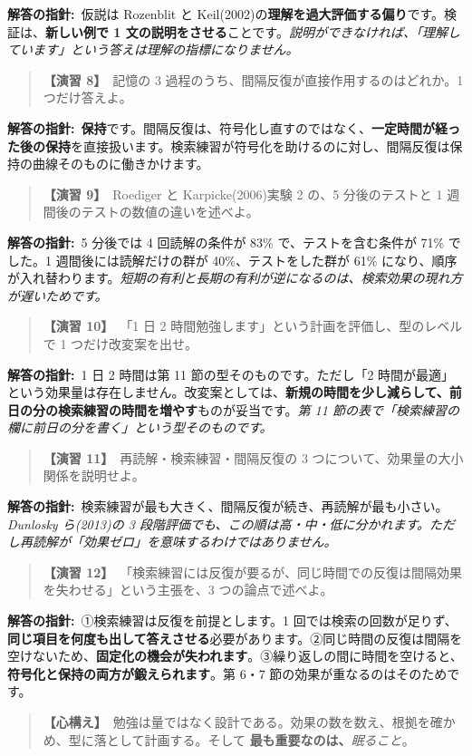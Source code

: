 \documentclass{article}
\begin{document}
\textbf{解答の指針:}\ 仮説は Rozenblit と Keil(2002)の\textbf{理解を過大評価する偏り}です。検証は、\textbf{新しい例で 1 文の説明をさせる}ことです。\emph{説明ができなければ、「理解しています」という答えは理解の指標になりません。}

\begin{quote}
\textbf{【演習 8】}\ 記憶の 3 過程のうち、間隔反復が直接作用するのはどれか。1 つだけ答えよ。
\end{quote}

\textbf{解答の指針:}\ \textbf{保持}です。間隔反復は、符号化し直すのではなく、\textbf{一定時間が経った後の保持}を直接扱います。検索練習が符号化を助けるのに対し、間隔反復は保持の曲線そのものに働きかけます。

\begin{quote}
\textbf{【演習 9】}\ Roediger と Karpicke(2006)実験 2 の、5 分後のテストと 1 週間後のテストの数値の違いを述べよ。
\end{quote}

\textbf{解答の指針:}\ 5 分後では 4 回読解の条件が 83\% で、テストを含む条件が 71\% でした。1 週間後には読解だけの群が 40\%、テストをした群が 61\% になり、順序が入れ替わります。\emph{短期の有利と長期の有利が逆になるのは、検索効果の現れ方が遅いためです。}

\begin{quote}
\textbf{【演習 10】}\ 「1 日 2 時間勉強します」という計画を評価し、型のレベルで 1 つだけ改変案を出せ。
\end{quote}

\textbf{解答の指針:}\ 1 日 2 時間は第 11 節の型そのものです。ただし「2 時間が最適」という効果量は存在しません。改変案としては、\textbf{新規の時間を少し減らして、前日の分の検索練習の時間を増やす}ものが妥当です。\emph{第 11 節の表で「検索練習の欄に前日の分を書く」という型そのものです。}

\begin{quote}
\textbf{【演習 11】}\ 再読解・検索練習・間隔反復の 3 つについて、効果量の大小関係を説明せよ。
\end{quote}

\textbf{解答の指針:}\ 検索練習が最も大きく、間隔反復が続き、再読解が最も小さい。\emph{Dunlosky ら(2013)の 3 段階評価でも、この順は高・中・低に分かれます。ただし再読解が「効果ゼロ」を意味するわけではありません。}

\begin{quote}
\textbf{【演習 12】}\ 「検索練習には反復が要るが、同じ時間での反復は間隔効果を失わせる」という主張を、3 つの論点で述べよ。
\end{quote}

\textbf{解答の指針:}\ ①検索練習は反復を前提とします。1 回では検索の回数が足りず、\textbf{同じ項目を何度も出して答えさせる}必要があります。②同じ時間の反復は間隔を空けないため、\textbf{固定化の機会が失われます}。③繰り返しの間に時間を空けると、\textbf{符号化と保持の両方が鍛えられます}。第 6・7 節の効果が重なるのはそのためです。

\begin{quote}
\textbf{【心構え】}\ 勉強は量ではなく設計である。効果の数を数え、根拠を確かめ、型に落として計画する。そして
\textbf{最も重要なのは、}\emph{眠ること}。
\end{quote}
\end{document}
